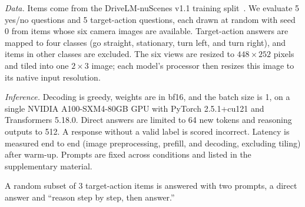 \textit{Data.} Items come from the DriveLM-nuScenes v1.1 training split~\cite{sima2024drivelm}. We evaluate 5 yes/no questions and 5 target-action questions, each drawn at random with seed 0 from items whose six camera images are available. Target-action answers are mapped to four classes (go straight, stationary, turn left, and turn right), and items in other classes are excluded. The six views are resized to $448\times252$ pixels and tiled into one $2\times3$ image; each model's processor then resizes this image to its native input resolution.

\textit{Inference.} Decoding is greedy, weights are in bf16, and the batch size is 1, on a single NVIDIA A100-SXM4-80GB GPU with PyTorch 2.5.1+cu121 and Transformers 5.18.0. Direct answers are limited to 64 new tokens and reasoning outputs to 512. A response without a valid label is scored incorrect. Latency is measured end to end (image preprocessing, prefill, and decoding, excluding tiling) after warm-up. Prompts are fixed across conditions and listed in the supplementary material.

A random subset of 3 target-action items is answered with two prompts, a direct answer and ``reason step by step, then answer.''

